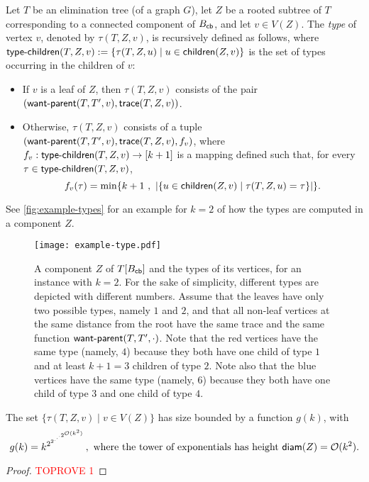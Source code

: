 \documentclass[a4paper,UKenglish,cleveref, autoref, thm-restate]{lipics-v2021}
\newcommand{\child}{{\sf children}\xspace}
\newcommand{\diam}{{\sf diam}\xspace}
\newcommand{\Bcb}{B_{\sf cb}\xspace}
\newcommand{\trace}{{\sf trace}\xspace}
\newcommand{\typechild}{{\sf type\text{-}children}\xspace}
\newcommand{\wantparent}{{\sf {\sf want{\text -}parent}}\xspace}
\newcommand{\Ocal}{{\mathcal O}\xspace}
\begin{document}
\begin{definition}
\label{def:type}
Let $T$ be an elimination tree (of a graph $G$), let $Z$ be a rooted subtree of $T$ corresponding to a connected component of $\Bcb$, and let $v \in V(Z)$. The \emph{type} of  vertex $v$, denoted by $\tau(T,Z,v)$, is recursively defined as follows, where $\typechild(T,Z,v):=\{\tau(T,Z,u) \mid u \in \child(Z,v)\}$ is the set of types occurring in the children of $v$:
\begin{itemize}
    \item If $v$ is a leaf of $Z$, then $\tau(T,Z,v)$ consists of the pair $(\wantparent(T,T',v),\trace(T,Z,v))$.
    \item Otherwise, $\tau(T,Z,v)$ consists of a tuple $(\wantparent(T,T',v),\trace(T,Z,v), f_v)$, where $f_v: \typechild(T,Z,v) \to [k+1]$ is a mapping defined such that, for every $\tau \in \typechild(T,Z,v)$,
    \begin{equation}\label{eq:definition-type}
      f_v(\tau)= \min\{k+1 \ ,\ |\{u \in \child(Z,v) \mid \tau(T,Z,u) = \tau\}|\}.
    \end{equation}
\end{itemize}
\end{definition}

See \autoref{fig:example-types} for an example for $k=2$ of how the types are computed in a component $Z$.


\begin{figure}[h!tb]
    \centering
\texttt{[image: example-type.pdf]}
    \caption{A component $Z$ of $T[\Bcb]$ and the types of its vertices, for an instance with $k=2$. For the sake of simplicity, different types are depicted with different numbers. Assume that the leaves have only two possible types, namely $1$ and $2$, and that all non-leaf vertices at the same distance from the root have the same trace and the same function $\wantparent(T,T',\cdot)$. Note that the red vertices have the same type (namely, $4$) because they both have one child of type $1$ and at least $k+1=3$ children of type $2$. Note also that the blue vertices have the same type (namely, $6$) because they both have one child of type $3$ and one child of type $4$.\label{fig:example-types}}
\end{figure}

\begin{lemma}\label{lem:number-types}
The set $\{\tau(T,Z,v) \mid v \in V(Z)\}$ has size bounded by a function $g(k)$, with
\begin{equation}\label{eq:number-types}
    g(k) = k^{2^{2^{.^{.^{.{2^{\Ocal(k^2)}}}}}}}, \text{ where the tower of exponentials has height $\diam(Z) = \Ocal(k^2)$.}
\end{equation}
\end{lemma}
\begin{proof}\textcolor{red}{TOPROVE 1}\end{proof}
\end{document}
